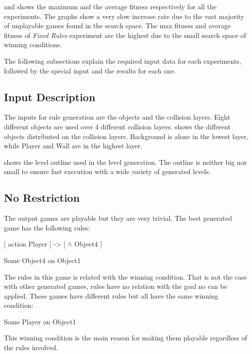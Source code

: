  and  shows the maximum and the average fitness respectively for all the experiments. The graphs show a very slow increase rate due to the vast majority of unplayable games found in the search space. The max fitness and average fitness of \emph{Fixed Rules} experiment are the highest due to the small search space of winning conditions.



The following subsections explain the required input data for each experiments, followed by the special input and the results for each one.

\subsection{Input Description}
The inputs for rule generation are the objects and the collision layers. Eight different objects are used over 4 different collision layers.  shows the different objects distributed on the collision layers. Background is alone in the lowest layer, while Player and Wall are in the highest layer.


 shows the level outline used in the level generation. The outline is neither big nor small to ensure fast execution with a wide variety of generated levels.


\subsection{No Restriction}
The output games are playable but they are very trivial. The best generated game has the following rules:
\begin{center}
[ action Player ] -> [ $\wedge$ Object4 ]
\end{center}
\begin{center}
Some Object4 on Object1
\end{center}
The rules in this game is related with the winning condition. That is not the case with other generated games, rules have no relation with the goal no can be applied. These games have different rules but all have the same winning condition:
\begin{center}
Some Player on Object1
\end{center}
This winning condition is the main reason for making them playable regardless of the rules involved.

